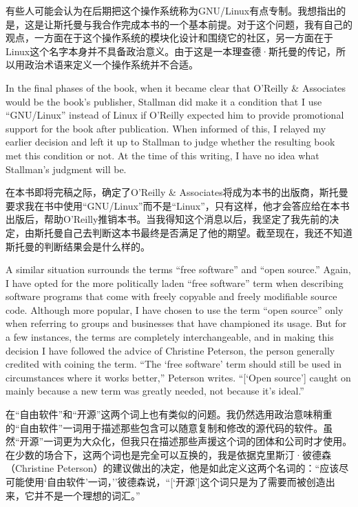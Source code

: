 \ifdefined\chs
有些人可能会认为在后期把这个操作系统称为GNU/Linux有点专制。我想指出的是，这是让斯托曼与我合作完成本书的一个基本前提。对于这个问题，我有自己的观点，一方面在于这个操作系统的模块化设计和围绕它的社区，另一方面在于Linux这个名字本身并不具备政治意义。由于这是一本理查德·斯托曼的传记，所以用政治术语来定义一个操作系统并不合适。
\fi

\ifdefined\eng
In the final phases of the book, when it became clear that O'Reilly \& Associates would be the book's publisher, Stallman did make it a condition that I use ``GNU/Linux'' instead of Linux if O'Reilly expected him to provide promotional support for the book after publication. When informed of this, I relayed my earlier decision and left it up to Stallman to judge whether the resulting book met this condition or not. At the time of this writing, I have no idea what Stallman's judgment will be.
\fi

\ifdefined\chs
在本书即将完稿之际，确定了O'Reilly \& Associates将成为本书的出版商，斯托曼要求我在书中使用``GNU/Linux''而不是``Linux''，只有这样，他才会答应给在本书出版后，帮助O'Reilly推销本书。当我得知这个消息以后，我坚定了我先前的决定，由斯托曼自己去判断这本书最终是否满足了他的期望。截至现在，我还不知道斯托曼的判断结果会是什么样的。
\fi

\ifdefined\eng
A similar situation surrounds the terms ``free software'' and ``open source.'' Again, I have opted for the more politically laden ``free software'' term when describing software programs that come with freely copyable and freely modifiable source code. Although more popular, I have chosen to use the term ``open source'' only when referring to groups and businesses that have championed its usage. But for a few instances, the terms are completely interchangeable, and in making this decision I have followed the advice of Christine Peterson, the person generally credited with coining the term. ``The `free software' term should still be used in circumstances where it works better,'' Peterson writes. ``[`Open source'] caught on mainly because a new term was greatly needed, not because it's ideal.''
\fi

\ifdefined\chs
在``自由软件''和``开源''这两个词上也有类似的问题。我仍然选用政治意味稍重的``自由软件''一词用于描述那些包含可以随意复制和修改的源代码的软件。虽然``开源''一词更为大众化，但我只在描述那些声援这个词的团体和公司时才使用。在少数的场合下，这两个词也是完全可以互换的，我是依据克里斯汀·彼德森（Christine Peterson）的建议做出的决定，他是如此定义这两个名词的：``应该尽可能使用`自由软件'一词，''彼德森说，``[`开源']这个词只是为了需要而被创造出来，它并不是一个理想的词汇。''
\fi

\setcounter{endnote}{0}
